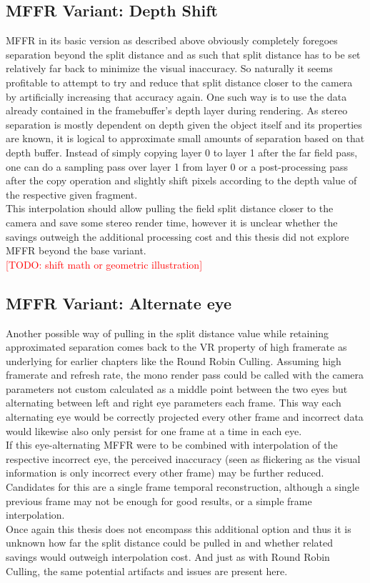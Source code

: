 \subsection{MFFR Variant: Depth Shift}  \label{mffr_depthshift}
MFFR in its basic version as described above obviously completely foregoes separation beyond the split distance and as such that split distance has to be set relatively far back to minimize the visual inaccuracy. So naturally it seems profitable to attempt to try and reduce that split distance closer to the camera by artificially increasing that accuracy again. One such way is to use the data already contained in the framebuffer's depth layer during rendering. 
As stereo separation is mostly dependent on depth given the object itself and its properties are known, it is logical to approximate small amounts of separation based on that depth buffer. 
Instead of simply copying layer 0 to layer 1 after the far field pass, one can do a sampling pass over layer 1 from layer 0 or a post-processing pass after the copy operation and slightly shift pixels according to the depth value of the respective given fragment. \\
This interpolation should allow pulling the field split distance closer to the camera and save some stereo render time, however it is unclear whether the savings outweigh the additional processing cost and this thesis did not explore MFFR beyond the base variant. \\

\textcolor{red}{[TODO: shift math or geometric illustration]}

\subsection{MFFR Variant: Alternate eye}
Another possible way of pulling in the split distance value while retaining approximated separation comes back to the VR property of high framerate as underlying for earlier chapters like the Round Robin Culling. 
Assuming high framerate and refresh rate, the mono render pass could be called with the camera parameters not custom calculated as a middle point between the two eyes but alternating between left and right eye parameters each frame. This way each alternating eye would be correctly projected every other frame and incorrect data would likewise also only persist for one frame at a time in each eye. \\
If this eye-alternating MFFR were to be combined with interpolation of the respective incorrect eye, the perceived inaccuracy (seen as flickering as the visual information is only incorrect every other frame) may be further reduced. Candidates for this are a single frame temporal reconstruction, although a single previous frame may not be enough for good results, or a simple frame interpolation. \\
Once again this thesis does not encompass this additional option and thus it is unknown how far the split distance could be pulled in and whether related savings would outweigh interpolation cost. And just as with Round Robin Culling, the same potential artifacts and issues are present here. 
